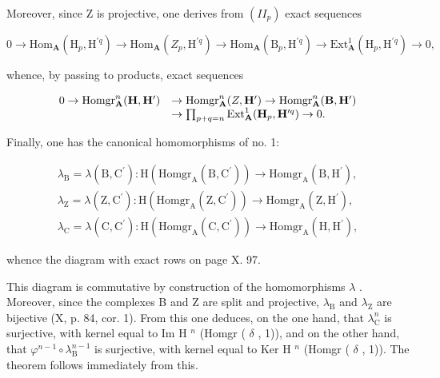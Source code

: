 Moreover, since Z is projective, one derives from \((II_{p})\) exact sequences

\[
0 \to \mathrm{Hom} _ {\mathbf {A}} (\mathrm{H} _ {p}, \mathrm{H} ^ {\prime q}) \to \mathrm{Hom} _ {\mathbf {A}} (Z _ {p}, \mathrm{H} ^ {\prime q}) \to \mathrm{Hom} _ {\mathbf {A}} (\mathrm{B} _ {p}, \mathrm{H} ^ {\prime q}) \to \mathrm{Ext} _ {\mathbf {A}} ^ {1} (\mathrm{H} _ {p}, \mathrm{H} ^ {\prime q}) \to 0,
\]

whence, by passing to products, exact sequences

\[
\begin{array}{r l} 0 \to \operatorname{Homgr} _ {\mathbf {A}} ^ {n} (\mathbf {H}, \mathbf {H} ^ {\prime}) & \to \operatorname{Homgr} _ {\mathbf {A}} ^ {n} (Z, \mathbf {H} ^ {\prime}) \to \operatorname{Homgr} _ {\mathbf {A}} ^ {n} (\mathbf {B}, \mathbf {H} ^ {\prime}) \\ & \to \prod_ {p + q = n} \operatorname{Ext} _ {\mathbf {A}} ^ {1} (\mathbf {H} _ {p}, \mathbf {H} ^ {\prime q}) \to 0. \end{array}
\]

Finally, one has the canonical homomorphisms of no. 1:

\[
\begin{array}{l} \lambda_ {\mathrm{B}} = \lambda (\mathrm{B}, \mathrm{C} ^ {\prime}): \mathrm{H} (\mathrm{Homgr} _ {\mathrm{A}} (\mathrm{B}, \mathrm{C} ^ {\prime})) \to \mathrm{Homgr} _ {\mathrm{A}} (\mathrm{B}, \mathrm{H} ^ {\prime}), \\ \lambda_ {\mathrm{Z}} = \lambda (\mathrm{Z}, \mathrm{C} ^ {\prime}): \mathrm{H} (\mathrm{Homgr} _ {\mathrm{A}} (\mathrm{Z}, \mathrm{C} ^ {\prime})) \to \mathrm{Homgr} _ {\mathrm{A}} (\mathrm{Z}, \mathrm{H} ^ {\prime}), \\ \lambda_ {\mathrm{C}} = \lambda (\mathrm{C}, \mathrm{C} ^ {\prime}): \mathrm{H} (\mathrm{Homgr} _ {\mathrm{A}} (\mathrm{C}, \mathrm{C} ^ {\prime})) \to \mathrm{Homgr} _ {\mathrm{A}} (\mathrm{H}, \mathrm{H} ^ {\prime}), \end{array}
\]

whence the diagram with exact rows on page X. 97.

This diagram is commutative by construction of the homomorphisms \(\lambda\) . Moreover, since the complexes B and Z are split and projective, \(\lambda_{\mathrm{B}}\) and \(\lambda_{\mathrm{Z}}\) are bijective (X, p. 84, cor. 1). From this one deduces, on the one hand, that \(\lambda_{\mathrm{C}}^{n}\) is surjective, with kernel equal to Im H \(^{n}\) (Homgr ( \(\delta\) , 1)), and on the other hand, that \(\varphi^{n-1} \circ \lambda_{\mathrm{B}}^{n-1}\) is surjective, with kernel equal to Ker H \(^{n}\) (Homgr ( \(\delta\) , 1)). The theorem follows immediately from this.

